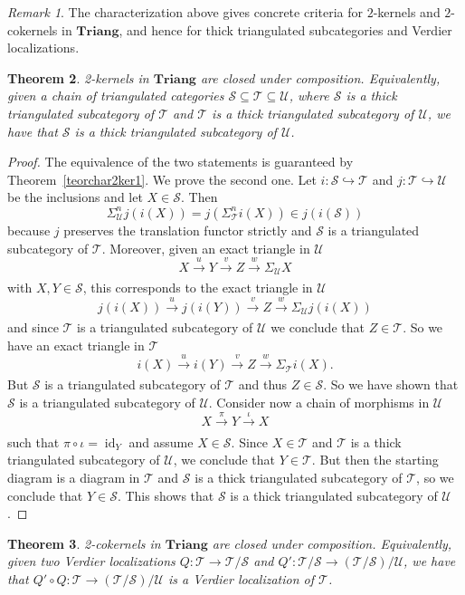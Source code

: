 \documentclass[11pt,reqno,a4paper]{amsart}
\newtheorem{theorem}{Theorem}[section]
\theoremstyle{definition}
\theoremstyle{remark}
\newtheorem{remark}[theorem]{Remark}
\def\nameit#1{\textrm{#1}~}
\def\thex{\nameit{Theorem}}
\newcommand{\T}{\mathcal{T}}
\renewcommand{\S}{\mathcal{S}}
\newcommand{\U}{\mathcal{U}}
\newcommand{\0}{\mathbf{0}}
\renewcommand{\1}{\mathbf{1}}
\newcommand{\Triang}{\mathbf{Triang}}
\def\:{\colon}
\def\c{\circ}
\newcommand{\id}[1]{\operatorname{id}_{#1}}
\newcommand{\aar}[2][]{\xrightarrow[#1]{#2}}
\begin{document}
\begin{remark}
    The characterization above gives concrete criteria for $2$-kernels and $2$-cokernels in $\Triang$, and hence for thick triangulated subcategories and Verdier localizations.
\end{remark}

\begin{theorem}\label{teor2kerclosed}
    2-kernels in $\Triang$ are closed under composition. Equivalently, given a chain of triangulated categories $\S \subseteq \T \subseteq \U$, where $\S$ is a thick triangulated subcategory of $\T$ and $\T$ is a thick triangulated subcategory of $\U$, we have that $\S$ is a thick triangulated subcategory of $\U$.
\end{theorem}

\begin{proof}
The equivalence of the two statements is guaranteed by \thex \ref{teorchar2ker1}. We prove the second one. Let $i\:\S \hookrightarrow \T$ and $j\: \T \hookrightarrow \U$ be the inclusions and let $X\in \S$. Then
$$\Sigma^n_{\U}j(i(X))=j(\Sigma^n_{\T}i(X))\in j(i(\S))$$
because $j$ preserves the translation functor strictly and $\S$ is a triangulated subcategory of $\T$. Moreover, given an exact triangle in $\U$
$$X \aar{u} Y \aar{v} Z \aar{w} \Sigma_{\U} X$$
with $X,Y\in \S$, this corresponds to the exact triangle in $\U$
$$j(i(X)) \aar{u} j(i(Y)) \aar{v} Z \aar{w} \Sigma_{\U} j(i(X))$$
and since $\T$ is a triangulated subcategory of $\U$ we conclude that $Z\in \T$. So we have an exact triangle in $\T$
$$i(X) \aar{u} i(Y) \aar{v} Z \aar{w} \Sigma_{\T} i(X).$$
But $\S$ is a triangulated subcategory of $\T$ and thus $Z\in \S$. So we have shown that $\S$ is a triangulated subcategory of $\U$. Consider now a chain of morphisms in $\U$
$$X \aar{\pi} Y \aar{\iota} X$$
such that $\pi \c \iota= \id{Y}$ and assume $X\in \S$. Since $X\in \T$ and $\T$ is a thick triangulated subcategory of $\U$, we conclude that $Y\in \T$. But then the starting diagram is a diagram in $\T$ and $\S$ is a thick triangulated subcategory of $\T$, so we conclude that $Y\in \S$. This shows that $\S$ is a thick triangulated subcategory of $\U$.
\end{proof}

\begin{theorem}\label{teor2cokerclosed}
    2-cokernels in $\Triang$ are closed under composition. Equivalently, given two Verdier localizations $Q\: \T \to \T/\S$ and $Q'\:\T /\S \to (\T/\S)/\U$, we have that $Q' \c Q\:\T \to (\T/\S)/\U$ is a Verdier localization of $\T$.
\end{theorem}
\end{document}
